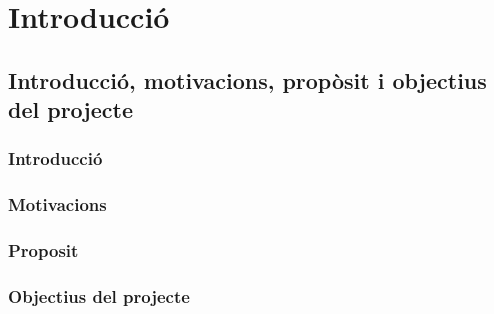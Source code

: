 \chapter{Introducció}
\section{Introducció, motivacions, propòsit i objectius del projecte}
\subsection{Introducció}

\subsection{Motivacions}

\subsection{Proposit}

\subsection{Objectius del projecte}